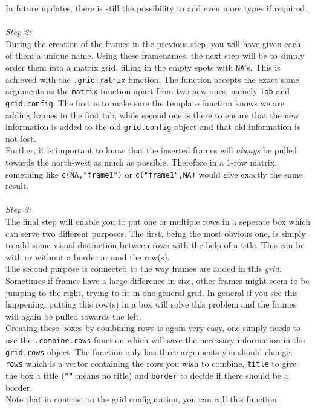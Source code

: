 \documentclass[a4paper]{article}\usepackage[]{graphicx}\usepackage[]{color}
\begin{document}
\noindent In future updates, there is still the possibility to add even more
types if required.
\\ \\
{\it Step 2:}\\
During the creation of the frames in the previous step, you will have given each
of them a unique name. Using these framenames, the next step will be to simply
order them into a matrix grid, filling in the empty spots with \verb|NA|'s.
This is achieved with the \verb|.grid.matrix| function. The function accepts
the exact same arguments as the \verb|matrix| function apart from two new ones,
namely \verb|Tab| and \verb|grid.config|. The first is to make sure the
template function knows we are adding frames in the first tab, while second one
is there to ensure that the new information is added to the old
\verb|grid.config| object and that old information is not lost.\\
Further, it is important to know that the inserted frames will {\it always} be
pulled towards the north-west as much as possible. Therefore in a 1-row
matrix, something like \verb|c(NA,"frame1")| or \verb|c("frame1",NA)| would give
exactly the same result.
\\ \\
{\it Step 3:}\\
The final step will enable you to put one or multiple rows in a seperate box
which can serve two different purposes. The first, being the most obvious one, is
simply to add some visual distinction between rows with the help of a title.
This can be with or without a border around the row(s).\\
The second purpose is connected to the way frames are added in this {\it grid}.
Sometimes if frames have a large difference in size, other frames might seem to
be jumping to the right, trying to fit in one general grid. In general if you
see this happening, putting this row(s) in a box will solve this problem and the
frames will again be pulled towards the left.\\
Creating these boxes by combining rows is again very easy, one simply needs to
use the \verb|.combine.rows| function which will save the necessary information
in the \verb|grid.rows| object. The function only has three arguments you should
change: \verb|rows| which is a vector containing the rows you wish to
combine, \verb|title| to give the box a title (\verb|""| means no title) and
\verb|border| to decide if there should be a border.\\
Note that in contrast to the grid configuration, you can call this function
\end{document}
